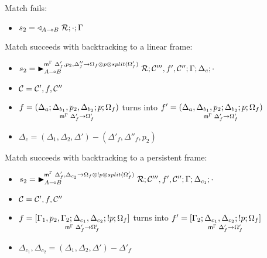 
   \item Match fails:
   \begin{itemize}[leftmargin=\secondm]
      \item $s_2 = \contstate{A \lolli B}{\rulestk}{\cdot}{\Gamma}$
   \end{itemize}

   \item Match succeeds with backtracking to a linear frame:
   \begin{itemize}[leftmargin=\secondm]
      \item $s_2 = \matstate{A \lolli B}{\rulestk}{\lstack{C'''}, f',
         \lstack{C''}}{\Gamma}{\Delta_c}{\cdot}{\Delta'_f, p_2, \Delta''_f \rightarrow
         \Omega_f \otimes p \otimes split(\Omega'_f)}$

      \item $\lstack{C} = \lstack{C'}, f, \lstack{C''}$

      \item $f = \lframe{\Delta_a}{\Delta_{b_1}, p_2, \Delta_{b_2}}{p}{\Omega_f}{\Delta_f'}{\Omega_f'}$
      turns into $f' = \lframe{\Delta_a, \Delta_{b_1}, p_2}
{\Delta_{b_2}}{p}{\Omega_f}{\Delta_f'}{\Omega_f'}$

      \item $\Delta_c = (\Delta_1, \Delta_2, \Delta') - (\Delta'_f, \Delta''_f, p_2)$
   \end{itemize}

   \item Match succeeds with backtracking to a persistent frame:
   \begin{itemize}[leftmargin=\secondm]
      \item $s_2 = \matstate{A \lolli B}{\rulestk}{\lstack{C'''}, f',
         \lstack{C''}}{\Gamma}{\Delta_{c_1}}{\cdot}{\Delta'_f, \Delta_{c_2}
            \rightarrow \Omega_f \otimes \bang p \otimes split(\Omega'_f)}$
      \item $\lstack{C} = \lstack{C'}, f, \lstack{C''}$

      \item $f = \pframe{\Gamma_1, p_2,
         \Gamma_2}{\Delta_{c_1}, \Delta_{c_2}}{\bang p}{\Omega_f}{\Delta'_f}{\Omega'_f}$
      turns into $f' = \pframe{\Gamma_2}{\Delta_{c_1},
         \Delta_{c_2}}{\bang p}{\Omega_f}{\Delta'_f}{\Omega'_f}$

      \item $\Delta_{c_1}, \Delta_{c_2} = (\Delta_1, \Delta_2,
            \Delta') - \Delta'_f$
   \end{itemize}
